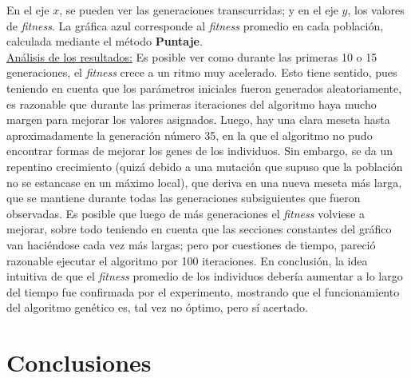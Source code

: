 \documentclass[12pt,a4paper]{article}
\begin{document}
    En el eje $x$, se pueden ver las generaciones transcurridas; y en el eje $y$, los valores de \textit{fitness}. La gráfica azul corresponde al \textit{fitness} promedio en cada población, calculada mediante el método \textbf{Puntaje}. \\[3pt]
    
    \underline{Análisis de los resultados:} 
    Es posible ver como durante las primeras 10 o 15 generaciones, el \textit{fitness} crece a un ritmo muy acelerado. Esto tiene sentido, pues teniendo en cuenta que los parámetros iniciales fueron generados aleatoriamente, es razonable que durante las primeras iteraciones del algoritmo haya mucho margen para mejorar los valores asignados. Luego, hay una clara meseta hasta aproximadamente la generación número 35, en la que el algoritmo no pudo encontrar formas de mejorar los genes de los individuos.
    Sin embargo, se da un repentino crecimiento (quizá debido a una mutación que supuso que la población no se estancase en un máximo local), que deriva en una nueva meseta más larga, que se mantiene durante todas las generaciones subsiguientes que fueron observadas.
    Es posible que luego de más generaciones el \textit{fitness} volviese a mejorar, sobre todo teniendo en cuenta que las secciones constantes del gráfico van haciéndose cada vez más largas; pero por cuestiones de tiempo, pareció razonable ejecutar el algoritmo por 100 iteraciones.
    En conclusión, la idea intuitiva de que el \textit{fitness} promedio de los individuos debería aumentar a lo largo del tiempo fue confirmada por el experimento, mostrando que el funcionamiento del algoritmo genético es, tal vez no óptimo, pero sí acertado.




\newpage



\section{Conclusiones}









\end{document}
